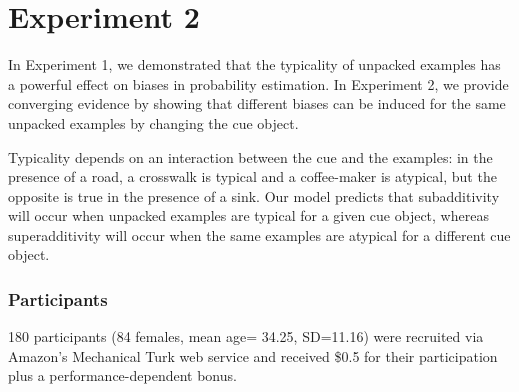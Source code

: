\section{Experiment 2}

In Experiment 1, we demonstrated that the typicality of unpacked examples has a powerful effect on biases in probability estimation. In Experiment 2, we provide converging evidence by showing that different biases can be induced for the same unpacked examples by changing the cue object.

Typicality depends on an interaction between the cue and the examples: in the presence of a road, a crosswalk is typical and a coffee-maker is atypical, but the opposite is true in the presence of a sink. Our model predicts that subadditivity will occur when unpacked examples are typical for a given cue object, whereas superadditivity will occur when the same examples are atypical for a different cue object.



\subsubsection{Participants}
180 participants (84 females, mean age= 34.25, SD=11.16) were recruited via Amazon's Mechanical Turk web service and received \$0.5 for their participation plus a performance-dependent bonus.

